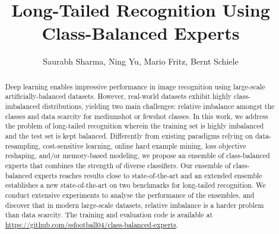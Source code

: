 \documentclass[runningheads]{llncs}
\begin{document}
	\pagestyle{headings}
	\mainmatter

	\title{Long-Tailed Recognition Using Class-Balanced Experts}

 \author{Saurabh Sharma,
            Ning Yu,
            Mario Fritz, Bernt Schiele}
	\maketitle
    \vspace{-2em}

\begin{abstract}
Deep learning enables impressive performance in image recognition using large-scale artificially-balanced datasets. However, real-world datasets exhibit highly class-imbalanced distributions, yielding two main challenges: relative imbalance amongst the classes and data scarcity for mediumshot or fewshot classes. In this work, we address the problem of long-tailed recognition wherein the training set is highly imbalanced and the test set is kept balanced. Differently from existing paradigms relying on data-resampling, cost-sensitive learning, online hard example mining, loss objective reshaping, and/or memory-based modeling, we propose an ensemble of class-balanced experts that combines the strength of diverse classifiers.
Our ensemble of class-balanced experts reaches results close to state-of-the-art and an extended ensemble establishes a new state-of-the-art on two benchmarks for long-tailed recognition. We conduct extensive experiments to analyse the performance of the ensembles, and discover that in modern large-scale datasets, relative imbalance is a harder problem than data scarcity. The training and evaluation code is available at \url{https://github.com/ssfootball04/class-balanced-experts}.
\end{abstract}
\end{document}

